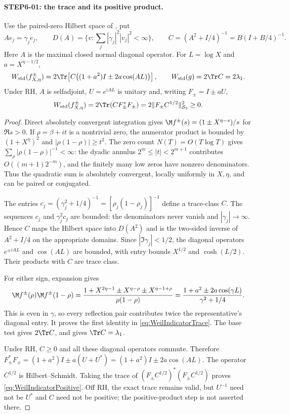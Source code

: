 \paragraph{STEP6-01: the trace and its positive product.}
Use the paired-zero Hilbert space of , put
\[
 Ae_j=\gamma_je_j,\qquad
 D(A)=\{v:\sum_j|\gamma_j|^2|v_j|^2<\infty\},\qquad
 C=(A^2+I/4)^{-1}=B(I+B/4)^{-1}.
\]
Here $A$ is the maximal closed normal diagonal operator. For $L=\log X$ and $a=X^{\eta-1/2}$,
\begin{equation}\label{eq:WeilIndicatorTrace}
 W_{\rm std}(f^\pm_{X,\eta})
 =2\Tr\!\left[C\bigl((1+a^2)I\pm2a\cos(AL)\bigr)\right],
 \qquad W_{\rm std}(g)=2\Tr C=2\lambda_1.
\end{equation}
Under RH, $A$ is selfadjoint, $U=e^{iAL}$ is unitary and, writing $F_\pm=I\pm aU$,
\begin{equation}\label{eq:WeilIndicatorPositive}
 W_{\rm std}(f^\pm_{X,\eta})
 =2\Tr(CF_\pm^*F_\pm)
 =2\|F_\pm C^{1/2}\|_{\mathcal S_2}^{2}\ge0.
\end{equation}
\begin{proof}
Direct absolutely convergent integration gives $\M f^\pm(s)=(1\pm X^{\eta-s})/s$ for $\Re s>0$. If $\rho=\beta+it$ is a nontrivial zero, the numerator product is bounded by $(1+X^\eta)^2$ and $|\rho(1-\rho)|\ge t^2$. The zero count $N(T)=O(T\log T)$ gives
$\sum_\rho|\rho(1-\rho)|^{-1}<\infty$: the dyadic annulus $2^m\le|t|<2^{m+1}$ contributes $O((m+1)2^{-m})$, and the finitely many low zeros have nonzero denominators. Thus the quadratic sum is absolutely convergent, locally uniformly in $X,\eta$, and can be paired or conjugated.

The entries $c_j=(\gamma_j^2+1/4)^{-1}=[\rho_j(1-\rho_j)]^{-1}$ define a trace-class $C$. The sequences $c_j$ and $\gamma_j^2c_j$ are bounded: the denominators never vanish and $|\gamma_j|\to\infty$. Hence $C$ maps the Hilbert space into $D(A^2)$ and is the two-sided inverse of $A^2+I/4$ on the appropriate domains. Since $|\Im\gamma_j|<1/2$, the diagonal operators $e^{\pm iAL}$ and $\cos(AL)$ are bounded, with entry bounds $X^{1/2}$ and $\cosh(L/2)$. Their products with $C$ are trace class.

For either sign, expansion gives
\[
 \M f^\pm(\rho)\M f^\pm(1-\rho)
 =\frac{1+X^{2\eta-1}\pm X^{\eta-\rho}\pm X^{\eta-1+\rho}}
 {\rho(1-\rho)}
 =\frac{1+a^2\pm2a\cos(\gamma L)}{\gamma^2+1/4}.
\]
This is even in $\gamma$, so every reflection pair contributes twice the representative's diagonal entry. It proves the first identity in \eqref{eq:WeilIndicatorTrace}. The base test gives $2\Tr C$, and  gives $\Tr C=\lambda_1$.

Under RH, $C\ge0$ and all these diagonal operators commute. Therefore
$F_\pm^*F_\pm=(1+a^2)I\pm a(U+U^*)=(1+a^2)I\pm2a\cos(AL)$.
The operator $C^{1/2}$ is Hilbert--Schmidt. Taking the trace of
$(F_\pm C^{1/2})^*(F_\pm C^{1/2})$ proves \eqref{eq:WeilIndicatorPositive}. Off RH, the exact trace remains valid, but $U^{-1}$ need not be $U^*$ and $C$ need not be positive; the positive-product step is not asserted there.
\end{proof}

